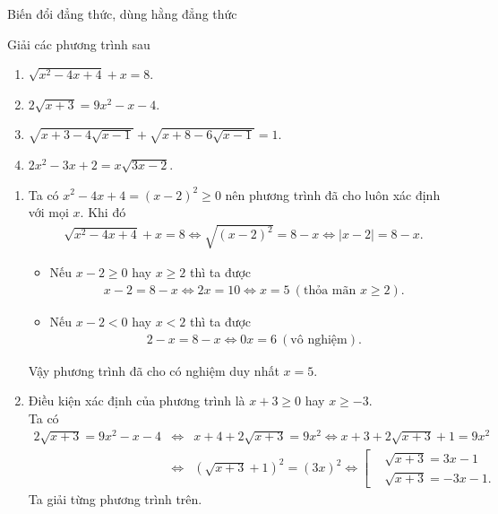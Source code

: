 \begin{dang}{Biến đổi đẳng thức, dùng hằng đẳng thức}
	
\end{dang}

\begin{vd}
	Giải các phương trình sau
	\begin{enumerate}
		\item $\sqrt{x^2-4x+4}+x=8$.
		\item $2\sqrt{x+3}=9x^2-x-4$.
		\item $\sqrt{x+3-4\sqrt{x-1}} + \sqrt{x+8-6\sqrt{x-1}}=1$.
		\item $2x^2-3x+2=x\sqrt{3x-2}$.
	\end{enumerate}
	\loigiai
	{
		\begin{enumerate}
			\item Ta có $x^2-4x+4=(x-2)^2\geq 0$ nên phương trình đã cho luôn xác định với mọi $x$. Khi đó
			\begin{eqnarray*}
				\sqrt{x^2-4x+4}+x=8 \Leftrightarrow \sqrt{(x-2)^2}=8-x \Leftrightarrow |x-2|=8-x.
			\end{eqnarray*}
			\begin{itemize}
				\item Nếu $x-2 \geq 0$ hay $x\geq 2$ thì ta được
				\begin{eqnarray*}
					x-2=8-x \Leftrightarrow 2x=10 \Leftrightarrow x=5 ~(\text{thỏa mãn } x\geq 2).
				\end{eqnarray*}
				\item Nếu $x-2 < 0$ hay $x< 2$ thì ta được
				\begin{eqnarray*}
					2-x=8-x \Leftrightarrow 0x=6 ~(\text{vô nghiệm}).
				\end{eqnarray*}
			\end{itemize}
			Vậy phương trình đã cho có nghiệm duy nhất $x=5$.
			\item Điều kiện xác định của phương trình là $x+3\geq 0$ hay $x\geq -3$.\\
			Ta có
			\begin{eqnarray*}
				2\sqrt{x+3}=9x^2-x-4 &\Leftrightarrow & x+4+2\sqrt{x+3}=9x^2 \Leftrightarrow x+3+2\sqrt{x+3}+1=9x^2\\
				&\Leftrightarrow & \left(\sqrt{x+3}+1\right)^2=(3x)^2 \Leftrightarrow \left[\begin{aligned}&\sqrt{x+3}=3x-1 \\&\sqrt{x+3}=-3x-1. \end{aligned}\right.
			\end{eqnarray*}
			Ta giải từng phương trình trên.

\end{enumerate}}
\end{vd}
